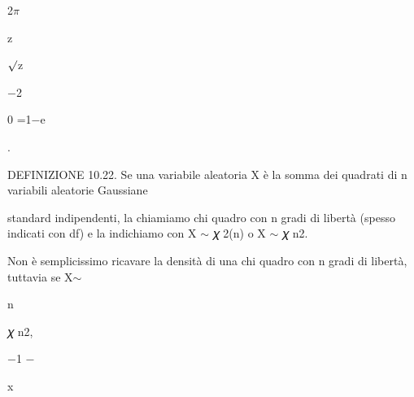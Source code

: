 \documentclass[a4paper,portrait,12pt]{article}
\begin{document}
\begin{flushleft}
2$\pi$
\end{flushleft}





\begin{flushleft}
z
\end{flushleft}


\begin{flushleft}
$\surd$z
\end{flushleft}


$-$2


\begin{flushleft}
0 =1$-$e
\end{flushleft}





.





\begin{flushleft}
DEFINIZIONE 10.22. Se una variabile aleatoria X \`{e} la somma dei quadrati di n variabili aleatorie Gaussiane
\end{flushleft}


\begin{flushleft}
standard indipendenti, la chiamiamo chi quadro con n gradi di libert\`{a} (spesso indicati con df) e la indichiamo con X $\sim$ 𝜒 2(n) o X $\sim$ 𝜒 n2.
\end{flushleft}


\begin{flushleft}
Non \`{e} semplicissimo ricavare la densit\`{a} di una chi quadro con n gradi di libert\`{a}, tuttavia se X$\sim$
\end{flushleft}


\begin{flushleft}
n
\end{flushleft}





\begin{flushleft}
𝜒 n2,
\end{flushleft}





$-$1 $-$





\begin{flushleft}
x
\end{flushleft}
\end{document}
